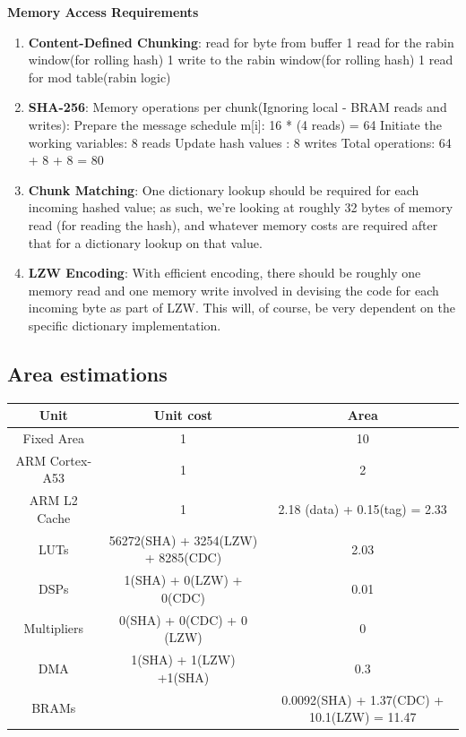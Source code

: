 \documentclass{article}
\begin{document}
\item%
\textbf{Memory Access Requirements}
\begin{enumerate}[label=(\roman*)]
\item%
\textbf{Content-Defined Chunking}: read for byte from buffer 1 read for the rabin window(for rolling hash) 1 write to the rabin window(for
rolling hash) 1 read for mod table(rabin logic)

\item%
\textbf{SHA-256}:\newline
Memory operations per chunk(Ignoring local - BRAM reads and writes): 
Prepare the message schedule m[i]: 16 * (4 reads) = 64 
Initiate the working variables: 8 reads  
Update hash values : 8 writes
Total operations: 64 + 8 + 8 = 80 

\item%
\textbf{Chunk Matching}:\newline
One dictionary lookup should be required for each incoming hashed value; as such, we're looking at roughly 32 bytes of memory read (for reading the hash), and whatever memory costs are required after that for a dictionary lookup on that value.

\item%
\textbf{LZW Encoding}:\newline
With efficient encoding, there should be roughly one memory read and one memory write involved in devising the code for each incoming byte as part of LZW. This will, of course, be very dependent on the specific dictionary implementation.

\end{enumerate}%

\subsection{Area estimations}
\begin{center}
\begin{tabular}{ |c|c|c| } 
 \hline
 \textbf{Unit}  & \textbf{Unit cost} & \textbf{Area} \\ 
 \hline
 Fixed Area   &     1    & 10  \\
 \hline
 ARM Cortex-A53  & 1  & 2\\
 \hline
 ARM L2 Cache  &  1   &  2.18 (data) + 0.15(tag) = 2.33\\
 \hline
 LUTs   &   56272(SHA) + 3254(LZW) + 8285(CDC)   &  2.03  \\
 \hline
 DSPs   &   1(SHA) + 0(LZW) + 0(CDC)    & 0.01\\
 \hline
 Multipliers    &   0(SHA) + 0(CDC) + 0 (LZW)   &   0\\
 \hline
 DMA    &   1(SHA) + 1(LZW) +1(SHA) &   0.3\\
 \hline
 BRAMs  &   &   0.0092(SHA) + 1.37(CDC) + 10.1(LZW) = 11.47\\
 \hline
  
\end{tabular}
\end{center}
\end{document}
